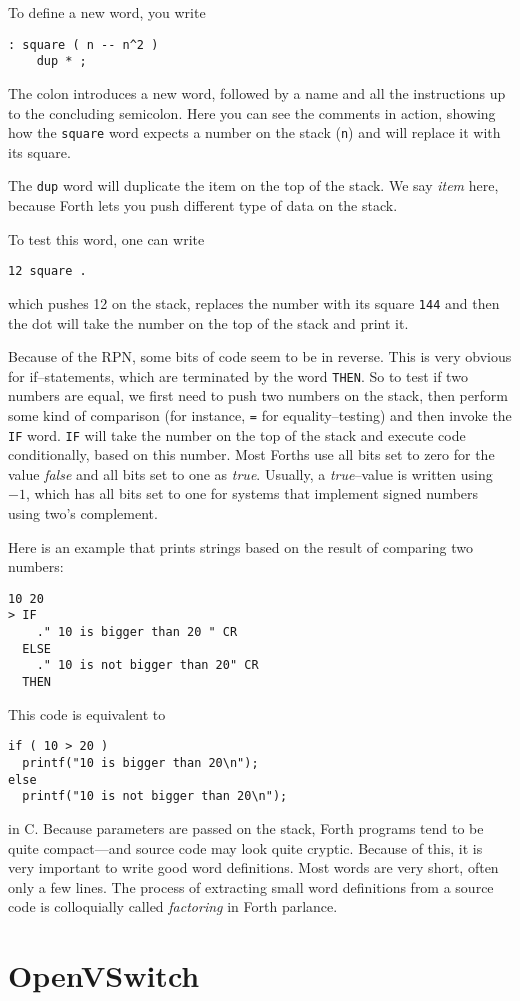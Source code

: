 To define a new word, you write

\begin{verbatim}
: square ( n -- n^2 )
    dup * ;
\end{verbatim}

The colon introduces a new word, followed by a name and all the instructions
up to the concluding semicolon.  Here you can see the comments in action,
showing how the \texttt{square} word expects a number on the stack
(\texttt{n}) and will replace it with its square.

The \texttt{dup} word will duplicate the item on the top of the stack.  We
say \textit{item} here, because Forth lets you push different type of data
on the stack.

To test this word, one can write 
\begin{verbatim}
12 square .
\end{verbatim}

which pushes 12 on the stack, replaces the number with its square
\texttt{144} and then the dot will take the number on the top of the stack
and print it.

Because of the \ac{RPN}, some bits of code seem to be in reverse.  This is
very obvious for if--statements, which are terminated by the word
\texttt{THEN}.  So to test if two numbers are equal, we first need to push
two numbers on the stack, then perform some kind of comparison (for
instance, \texttt{=} for equality--testing) and then invoke the
\texttt{IF} word.  \texttt{IF} will take the number on the top of the stack
and execute code conditionally, based on this number.  Most Forths use all
bits set to zero for the value \textit{false} and all bits set to one as
\textit{true}.  Usually, a \textit{true}--value is written using $-1$,
which has all bits set to one for systems that implement signed numbers
using two's complement.

Here is an example that prints strings based on the result of comparing two
numbers:

\begin{verbatim}
10 20
> IF
    ." 10 is bigger than 20 " CR
  ELSE
    ." 10 is not bigger than 20" CR
  THEN
\end{verbatim}

This code is equivalent to

\begin{verbatim}
if ( 10 > 20 )
  printf("10 is bigger than 20\n");
else
  printf("10 is not bigger than 20\n");
\end{verbatim}

in C.  Because parameters are passed on the stack, Forth programs tend to be
quite compact---and source code may look quite cryptic.  Because of this, it
is very important to write good word definitions.  Most words are very
short, often only a few lines.  The process of extracting small word
definitions from a source code is colloquially called \textit{factoring} in
Forth parlance.

\section{OpenVSwitch}

